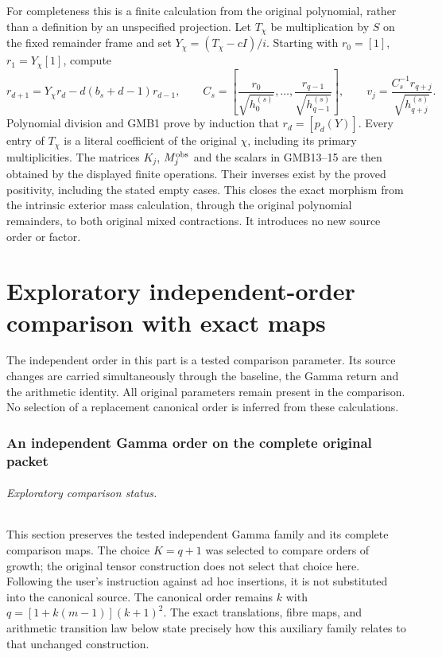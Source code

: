 \documentclass[11pt,a4paper]{article}
\begin{document}
For completeness this is a finite calculation from the original
polynomial, rather than a definition by an unspecified projection.
Let $T_\chi$ be multiplication by $S$ on the fixed remainder frame
and set $Y_\chi=(T_\chi-cI)/i$. Starting with
$r_0=[1]$, $r_1=Y_\chi[1]$, compute
\[
 r_{d+1}=Y_\chi r_d-d(b_s+d-1)r_{d-1},\qquad
 C_s=\left[\frac{r_0}{\sqrt{h_0^{(s)}}},\ldots,
                 \frac{r_{q-1}}{\sqrt{h_{q-1}^{(s)}}}\right],
 \qquad v_j=\frac{C_s^{-1}r_{q+j}}{\sqrt{h_{q+j}^{(s)}}}.
 \tag{GMB16}
\]
Polynomial division and GMB1 prove by induction that $r_d=[p_d(Y)]$.
Every entry of $T_\chi$ is a literal coefficient of the original
$\chi$, including its primary multiplicities. The matrices
$K_j$, $M_j^{\rm obs}$ and the scalars in GMB13--15 are then obtained
by the displayed finite operations. Their inverses exist by the
proved positivity, including the stated empty cases. This closes
the exact morphism from the intrinsic exterior mass calculation,
through the original polynomial remainders, to both original
mixed contractions. It introduces no new source order or factor.



\clearpage
\part{Exploratory independent-order comparison with exact maps}
The independent order in this part is a tested comparison parameter.
Its source changes are carried simultaneously through the baseline,
the Gamma return and the arithmetic identity. All original parameters
remain present in the comparison. No selection of a replacement
canonical order is inferred from these calculations.

\section{An independent Gamma order on the complete original packet}
\label{sec:IKO}

\paragraph{Exploratory comparison status.}
This section preserves the tested independent Gamma family and its
complete comparison maps. The choice $K=q+1$ was selected to compare
orders of growth; the original tensor construction does not select
that choice here. Following the user's instruction against ad hoc
insertions, it is not substituted into the canonical source. The
canonical order remains $k$ with $q=[1+k(m-1)](k+1)^2$.
The exact translations, fibre maps, and arithmetic transition law
below state precisely how this auxiliary family relates to that
unchanged construction.
\end{document}
